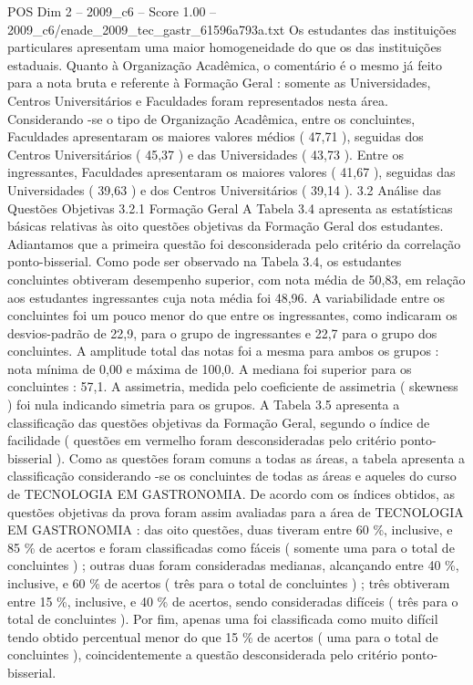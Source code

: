 \begin{textsample}{POS Dim 2 – 2009\_c6 – Score 1.00 – 2009\_c6/enade\_2009\_tec\_gastr\_61596a793a.txt}
Os estudantes das instituições particulares apresentam uma maior homogeneidade do que os das instituições estaduais.
Quanto à Organização Acadêmica, o comentário é o mesmo já feito para a nota bruta e referente à Formação Geral : somente as Universidades, Centros Universitários e Faculdades foram representados nesta área.
Considerando -se o tipo de Organização Acadêmica, entre os concluintes, Faculdades apresentaram os maiores valores médios ( 47,71 ), seguidas dos Centros Universitários ( 45,37 ) e das Universidades ( 43,73 ).
Entre os ingressantes, Faculdades apresentaram os maiores valores ( 41,67 ), seguidas das Universidades ( 39,63 ) e dos Centros Universitários ( 39,14 ). 3.2 Análise das Questões Objetivas 3.2.1 Formação Geral A Tabela 3.4 apresenta as estatísticas básicas relativas às oito questões objetivas da Formação Geral dos estudantes.
Adiantamos que a primeira questão foi desconsiderada pelo critério da correlação ponto-bisserial.
Como pode ser observado na Tabela 3.4, os estudantes concluintes obtiveram desempenho superior, com nota média de 50,83, em relação aos estudantes ingressantes cuja nota média foi 48,96.
A variabilidade entre os concluintes foi um pouco menor do que entre os ingressantes, como indicaram os desvios-padrão de 22,9, para o grupo de ingressantes e 22,7 para o grupo dos concluintes.
A amplitude total das notas foi a mesma para ambos os grupos : nota mínima de 0,00 e máxima de 100,0.
A mediana foi superior para os concluintes : 57,1.
A assimetria, medida pelo coeficiente de assimetria ( skewness ) foi nula indicando simetria para os grupos.
A Tabela 3.5 apresenta a classificação das questões objetivas da Formação Geral, segundo o índice de facilidade ( questões em vermelho foram desconsideradas pelo critério ponto-bisserial ).
Como as questões foram comuns a todas as áreas, a tabela apresenta a classificação considerando -se os concluintes de todas as áreas e aqueles do curso de TECNOLOGIA EM GASTRONOMIA.
De acordo com os índices obtidos, as questões objetivas da prova foram assim avaliadas para a área de TECNOLOGIA EM GASTRONOMIA : das oito questões, duas tiveram entre 60 \%, inclusive, e 85 \% de acertos e foram classificadas como fáceis ( somente uma para o total de concluintes ) ; outras duas foram consideradas medianas, alcançando entre 40 \%, inclusive, e 60 \% de acertos ( três para o total de concluintes ) ; três obtiveram entre 15 \%, inclusive, e 40 \% de acertos, sendo consideradas difíceis ( três para o total de concluintes ).
Por fim, apenas uma foi classificada como muito difícil tendo obtido percentual menor do que 15 \% de acertos ( uma para o total de concluintes ), coincidentemente a questão desconsiderada pelo critério ponto-bisserial.

\end{textsample}
